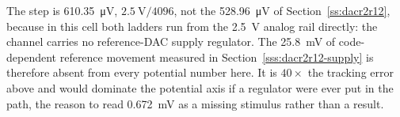 The step is \SI{610.35}{\micro\volt}, \(\SI{2.5}{\volt}/4096\), not the
\SI{528.96}{\micro\volt} of Section~\ref{ss:dacr2r12}, because in this cell
both ladders run from the \SI{2.5}{\volt} analog rail directly: the channel
carries no reference-DAC supply regulator. The \SI{25.8}{\milli\volt} of
code-dependent reference movement measured in
Section~\ref{sss:dacr2r12-supply} is therefore absent from every potential
number here. It is \(40\times\) the tracking error above and would dominate the
potential axis if a regulator were ever put in the path, the reason
to read \SI{0.672}{\milli\volt} as a missing stimulus rather than a result.

